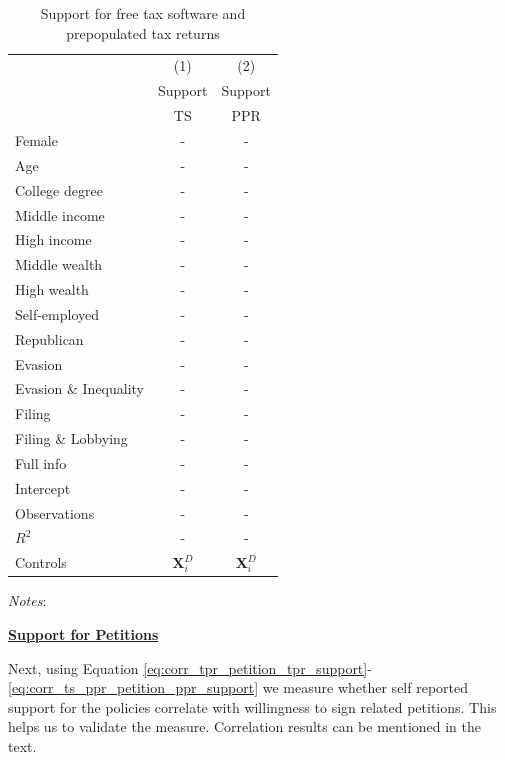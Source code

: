 \documentclass[11pt]{article}
\begin{document}
\begin{table}[!htbp]\centering
\caption{Support for free tax software and prepopulated tax returns}
\label{tab:supporttaxsoftware}
\begin{threeparttable}
\begin{tabular}{l|cc}
\toprule
& (1) & (2) \\
 & Support & Support  \\
 & TS  & PPR \\
\midrule
Female                     & - & -  \\
Age                        & - & -  \\
College degree             & - & -  \\
Middle income              & - & -  \\
High income                & - & -  \\
Middle wealth              & - & -  \\
High wealth                & - & -  \\
Self-employed              & - & -  \\
Republican                 & - & -  \\[1em]

Evasion        & - & - \\
Evasion \& Inequality     & - & - \\
Filing            & - & - \\
Filing \& Lobbying           & - & - \\
Full info               & - & - \\[0.5em]

Intercept              & - & - \\
\midrule
Observations                        &- &-      \\
$R^2$                               &- &-   \\
Controls                 &  $\mathbf{X}_{i}^{D}$ &  $\mathbf{X}_{i}^{D}$    \\
\bottomrule
\end{tabular}
\begin{tablenotes}[flushleft]
\footnotesize
\item \textit{Notes}:   
\end{tablenotes}
\end{threeparttable}
\end{table} 
\FloatBarrier


\begin{center}\textbf{\underline{Support for Petitions}}\end{center}
Next, using Equation \ref{eq:corr_tpr_petition_tpr_support}-\ref{eq:corr_ts_ppr_petition_ppr_support} we measure whether self reported support for the policies correlate with willingness to sign related petitions. This helps us to validate the measure. Correlation results can be mentioned in the text. 
\end{document}
